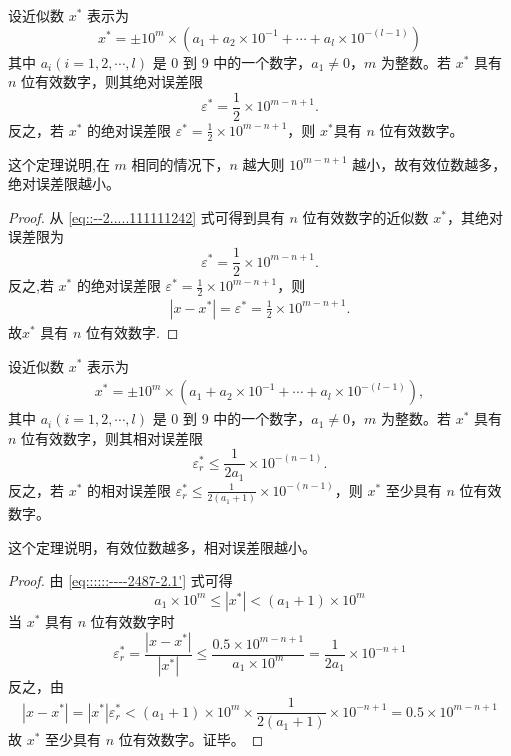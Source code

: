 \documentclass[../../main.tex]{subfiles}
\begin{document}
\begin{theorem}
设近似数 $x^*$ 表示为 
\[
x^* = \pm 10^m \times (a_1 + a_2 \times 10^{-1} + \cdots + a_l \times 10^{-(l - 1)}) \label{eq::::::----2487-2.1'}
\]
其中 $a_i (i = 1, 2, \cdots, l)$ 是 0 到 9 中的一个数字，$a_1 \neq 0$，$m$ 为整数。若 $x^*$ 具有 $n$ 位有效数字，则其绝对误差限
\[
\varepsilon^* = \frac{1}{2} \times 10^{m - n + 1}.
\]
反之，若 $x^*$ 的绝对误差限 $\varepsilon^* = \frac{1}{2} \times 10^{m - n + 1}$，则 $x^*$具有 $n$ 位有效数字。
\end{theorem}
\begin{note}
这个定理说明,在 $m$ 相同的情况下，$n$ 越大则 $10^{m - n + 1}$ 越小，故有效位数越多，绝对误差限越小。
\end{note}
\begin{proof}
从 \eqref{eq::--2.....111111242} 式可得到具有 $n$ 位有效数字的近似数 $x^*$，其绝对误差限为 
\[
\varepsilon^* = \frac{1}{2} \times 10^{m - n + 1}.
\]
反之,若 $x^*$ 的绝对误差限 $\varepsilon^* = \frac{1}{2} \times 10^{m - n + 1}$，则
\begin{align*}
|x-x^*|=\varepsilon^*=\frac{1}{2} \times 10^{m - n + 1}.
\end{align*}
故$x^*$ 具有 $n$ 位有效数字.
\end{proof}

\begin{theorem}
设近似数 $x^*$ 表示为
\begin{align}
x^* = \pm 10^m \times (a_1 + a_2 \times 10^{-1} + \cdots + a_l \times 10^{-(l - 1)}), \label{eq::::::----2487-2.1'}
\end{align}
其中 $a_i (i = 1, 2, \cdots, l)$ 是 0 到 9 中的一个数字，$a_1 \neq 0$，$m$ 为整数。若 $x^*$ 具有 $n$ 位有效数字，则其相对误差限 
\[
\varepsilon_r^* \leqslant \frac{1}{2a_1} \times 10^{-(n - 1)}.
\]
反之，若 $x^*$ 的相对误差限 $\varepsilon_r^* \leqslant \frac{1}{2(a_1 + 1)} \times 10^{-(n - 1)}$，则 $x^*$ 至少具有 $n$ 位有效数字。
\end{theorem}
\begin{note}
这个定理说明，有效位数越多，相对误差限越小。
\end{note}
\begin{proof}
由 \eqref{eq::::::----2487-2.1'} 式可得 
\[
a_1 \times 10^m \leqslant | x^* | < (a_1 + 1) \times 10^m
\]
当 $x^*$ 具有 $n$ 位有效数字时 
\[
\varepsilon_r^* = \frac{| x - x^* |}{| x^* |} \leqslant \frac{0.5 \times 10^{m - n + 1}}{a_1 \times 10^m} = \frac{1}{2a_1} \times 10^{-n + 1}
\]
反之，由 
\[
| x - x^* | = | x^* | \varepsilon_r^* < (a_1 + 1) \times 10^m \times \frac{1}{2(a_1 + 1)} \times 10^{-n + 1} = 0.5 \times 10^{m - n + 1}
\]
故 $x^*$ 至少具有 $n$ 位有效数字。证毕。
\end{proof}
\end{document}
